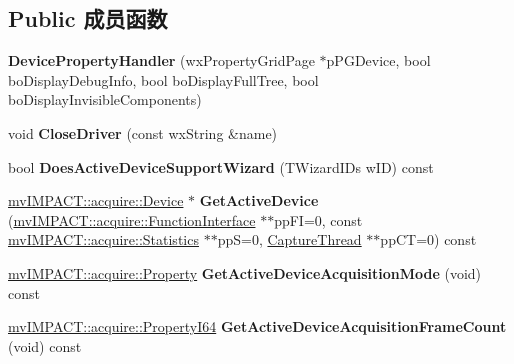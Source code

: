 \subsection*{Public 成员函数}
\begin{DoxyCompactItemize}
\item 
\hypertarget{class_device_property_handler_a9008c337853b73aba7ff13469bb1c603}{{\bfseries Device\+Property\+Handler} (wx\+Property\+Grid\+Page $\ast$p\+P\+G\+Device, bool bo\+Display\+Debug\+Info, bool bo\+Display\+Full\+Tree, bool bo\+Display\+Invisible\+Components)}\label{class_device_property_handler_a9008c337853b73aba7ff13469bb1c603}

\item 
\hypertarget{class_device_property_handler_ae5888f29022e26570fb88bb34d6aa519}{void {\bfseries Close\+Driver} (const wx\+String \&name)}\label{class_device_property_handler_ae5888f29022e26570fb88bb34d6aa519}

\item 
\hypertarget{class_device_property_handler_a970a02651f16e55ce6d199e97873fe70}{bool {\bfseries Does\+Active\+Device\+Support\+Wizard} (T\+Wizard\+I\+Ds w\+I\+D) const }\label{class_device_property_handler_a970a02651f16e55ce6d199e97873fe70}

\item 
\hypertarget{class_device_property_handler_a98b2fc606f2a1d971498d1d3987e73c6}{\hyperlink{classmv_i_m_p_a_c_t_1_1acquire_1_1_device}{mv\+I\+M\+P\+A\+C\+T\+::acquire\+::\+Device} $\ast$ {\bfseries Get\+Active\+Device} (\hyperlink{classmv_i_m_p_a_c_t_1_1acquire_1_1_function_interface}{mv\+I\+M\+P\+A\+C\+T\+::acquire\+::\+Function\+Interface} $\ast$$\ast$pp\+F\+I=0, const \hyperlink{classmv_i_m_p_a_c_t_1_1acquire_1_1_statistics}{mv\+I\+M\+P\+A\+C\+T\+::acquire\+::\+Statistics} $\ast$$\ast$pp\+S=0, \hyperlink{class_capture_thread}{Capture\+Thread} $\ast$$\ast$pp\+C\+T=0) const }\label{class_device_property_handler_a98b2fc606f2a1d971498d1d3987e73c6}

\item 
\hypertarget{class_device_property_handler_acc62a1d29942263b8cafd6a45a648aa4}{\hyperlink{classmv_i_m_p_a_c_t_1_1acquire_1_1_property}{mv\+I\+M\+P\+A\+C\+T\+::acquire\+::\+Property} {\bfseries Get\+Active\+Device\+Acquisition\+Mode} (void) const }\label{class_device_property_handler_acc62a1d29942263b8cafd6a45a648aa4}

\item 
\hypertarget{class_device_property_handler_ac2abc556dbbbeafeb80e090d49786784}{\hyperlink{group___common_interface_ga81749b2696755513663492664a18a893}{mv\+I\+M\+P\+A\+C\+T\+::acquire\+::\+Property\+I64} {\bfseries Get\+Active\+Device\+Acquisition\+Frame\+Count} (void) const }\label{class_device_property_handler_ac2abc556dbbbeafeb80e090d49786784}


\end{DoxyCompactItemize}
